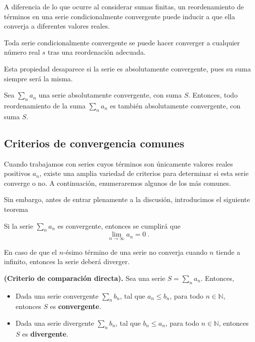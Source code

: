A diferencia de lo que ocurre al considerar sumas finitas, un reordenamiento de términos en una serie condicionalmente convergente puede inducir a que ella converja a diferentes valores reales.

\begin{teorema}
    Toda serie condicionalmente convergente se puede hacer converger a cualquier número real $s$ tras una reordenación adecuada.
\end{teorema}

Esta propiedad desaparece si la serie es absolutamente convergente, pues su suma siempre será la misma.

\begin{teorema}
    Sea $\sum\limits_n a_n$ una serie absolutamente convergente, con suma $S$. Entonces, todo reordenamiento de la suma $\sum\limits_n a_n$ es también absolutamente convergente, con suma $S$.
\end{teorema}

\subsection{Criterios de convergencia comunes}

Cuando trabajamos con series cuyos términos son únicamente valores reales positivos $a_n$, existe una amplia variedad de criterios para determinar si esta serie converge o no. A continuación, enumeraremos algunos de los más comunes.

Sin embargo, antes de entrar plenamente a la discusión, introducimos el siguiente teorema 
\begin{teorema}
    Si la serie $\sum\limits_n a_n$ es convergente, entonces se cumplirá que 
    \begin{equation}
        \lim_{n \to \infty} a_n = 0 \ .
    \end{equation}
\end{teorema}

En caso de que el $n$-ésimo término de una serie no converja cuando $n$ tiende a infinito, entonces la serie deberá diverger.


\begin{teorema}{\textbf{(Criterio de comparación directa).}}
    Sea una serie $S = \sum\limits_n a_n$. Entonces,
    \begin{itemize}
        \item Dada una serie convergente $\sum\limits_n b_n$, tal que $a_n \leq b_n$, para todo $n \in \mathbb{N}$, entonces $S$ es \textbf{convergente}.
        \item Dada una serie divergente $\sum\limits_n b_n$, tal que $b_n \leq a_n$, para todo $n \in \mathbb{N}$, entonces $S$ es \textbf{divergente}.
    \end{itemize}
\end{teorema}

